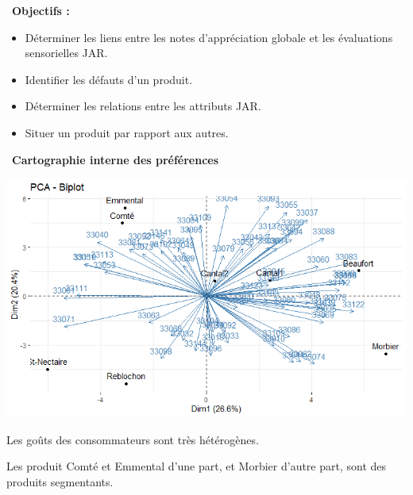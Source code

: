 \documentclass[aspectratio=169,xcolor=dvipsnames]{beamer}
\begin{document}
\begin{frame}
	
	\vfill

\textcolor{nyubluedarker}{\faBullseye \ \textbf{Objectifs :}}
		
	\medskip		
		
	\begin{itemize}
	\item[\faCogs] Déterminer les liens entre les notes d'appréciation globale et les évaluations sensorielles JAR.
	\item[\faCogs] Identifier les défauts d'un produit.
	\item[\faCogs] Déterminer les relations entre les attributs JAR.
	\item[\faCogs] Situer un produit par rapport aux autres.
	\end{itemize}
	
	\vfill	
	
\end{frame}

\begin{frame}
\textcolor{nyubluedarker}{\faChartBar \ \textbf{Cartographie interne des préférences}}

\begin{center}
\includegraphics[scale=0.5]{cart_interne.png}
\end{center}

\textcolor{nyubluedarker}{\faLightbulb[regular]} Les goûts des consommateurs sont très hétérogènes.

\medskip

\textcolor{nyubluedarker}{\faLightbulb[regular]} Les produit \og Comté \fg{} et \og Emmental \fg{} d'une part, et \og Morbier \fg{} d'autre part, sont des produits segmentants.  

\end{frame}
\end{document}
